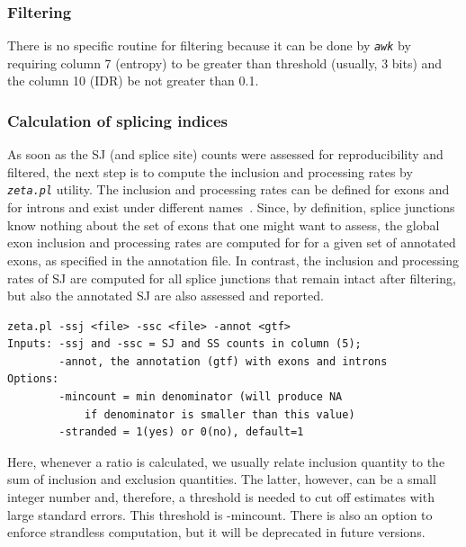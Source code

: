 \documentclass{article}
\newcommand{\prog}[1]{{\tt\em #1}}
\begin{document}

\subsubsection{Filtering}

There is no specific routine for filtering because it can be done by \prog{awk} by requiring column 7 (entropy)
to be greater than threshold (usually, 3 bits) and the column 10 (IDR) be not greater than 0.1.


\subsubsection{Calculation of splicing indices}
As soon as the SJ (and splice site) counts were assessed for reproducibility and filtered, the next step is to compute the inclusion and processing rates by \prog{zeta.pl} utility.
The inclusion and processing rates can be defined for exons and for introns and exist under different names~\cite{pmid23172860}. Since, by definition, splice junctions 
know nothing about the set of exons that one might want to assess, the  global exon inclusion and processing rates are computed for for a given set of 
annotated exons, as specified in the annotation file. In contrast, the inclusion and processing rates of SJ are computed for all splice junctions that remain
intact after filtering, but also the annotated SJ are also assessed and reported.

\begin{verbatim}
zeta.pl -ssj <file> -ssc <file> -annot <gtf>
Inputs: -ssj and -ssc = SJ and SS counts in column (5);
        -annot, the annotation (gtf) with exons and introns
Options:
        -mincount = min denominator (will produce NA 
            if denominator is smaller than this value)
        -stranded = 1(yes) or 0(no), default=1
\end{verbatim}
Here, whenever a ratio is calculated, we usually relate inclusion quantity to the sum of inclusion and exclusion quantities. The latter, however, can be a 
small integer number and, therefore, a threshold is needed to cut off estimates with large standard errors. This threshold is -mincount. There is also an option 
to enforce strandless computation, but it will be deprecated in future versions.
\end{document}
